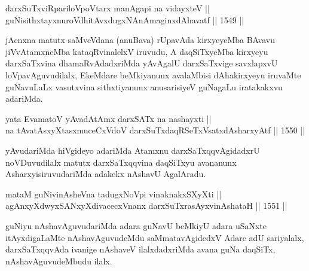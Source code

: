 \begin{shl}
darxSuTxviRpariloVpoV\s tarx manAgapi na vidayxteV || \\
\footnotemark[2]guNisithxtayxnuroVdhitAvxdugxNAnAmaginxdAhavatf ||  1549 ||  
\end{shl}

\begin{artha}
jAcnxna matutx saMveVdana (anuBava) rUpavAda kirxyeyeMba BAvavu jiVvAtamxneMba kataqRvinalelxV iruvudu, A daqSiTxyeMba kirxyeyu darxSaTxvina dhamaRvAdadxriMda yAvAgalU darxSaTxvige savxlapxvU loVpavAguvudilalx, EkeMdare beMkiyanunx avalaMbisi dAhakirxyeyu iruvaMte guNavuLaLx vasutxvina sithxtiyanunx anusarisiyeV guNagaLu iratakakxvu adariMda.
\end{artha}

\begin{shl}
yata EvamatoV \footnotemark[3]yAvadAtAmx darxSATx na nashayxti || \\
na tAvatAsxyXtasxmuceCxVdoV darxSuTxdaqRSeTxVsatxdAsharxyAtf ||  1550 ||  
\end{shl}

\begin{artha}
yAvudariMda hiVgideyo adariMda Atamxnu darxSaTxqqvAgidadxrU noVDuvudilalx matutx darxSaTxqqvina daqSiTxyu avananunx AsharxyisiruvudariMda adakekx nAshavU AgalAradu.
\end{artha}


\begin{shl}
mataM guNivinAsheVna tadugxNoV\s pi vinaknakxSXyXti || \\
agAnxyXdwyxSANxyXdivacecxVnanx \footnotemark[4]darxSuTxrasAyxvinAshataH ||  1551 ||  
\end{shl}

\begin{artha}
guNiyu nAshavAguvudariMda adara guNavU beMkiyU adara uSaNxte itAyxdigaLaMte nAshavAguvudeMdu saMmatavAgidedxV Adare adU sariyalalx, darxSaTxqqvAda ivanige nAshaveV ilalxdadxriMda avana guNa daqSiTx, nAshavAguvudeMbudu ilalx.
\end{artha}


